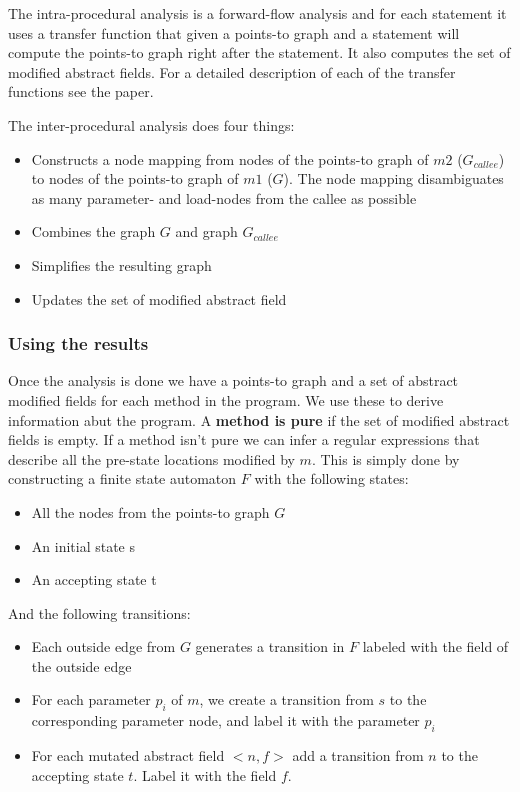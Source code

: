 \documentclass[11pt]{exam}
\begin{document}
The intra-procedural analysis is a forward-flow analysis and for each
statement it uses a transfer function that given a points-to graph and
a statement will compute the points-to graph right after the
statement. It also computes the set of modified abstract fields. For a
detailed description of each of the transfer functions see the paper.
\newline

The inter-procedural analysis does four things: 

\begin{itemize}
  \setlength{\itemsep}{1pt}
  \setlength{\parskip}{0pt}
  \item Constructs a node mapping from nodes of the points-to graph of 
        $m2$ ($G_{callee}$) to nodes of the points-to graph of 
        $m1$ ($G$). The node mapping disambiguates as many parameter- 
        and load-nodes from the callee as possible
  \item Combines the graph $G$ and graph $G_{callee}$
  \item Simplifies the resulting graph
  \item Updates the set of modified abstract field
\end{itemize}

\subsubsection*{Using the results}

Once the analysis is done we have a points-to graph and a set of
abstract modified fields for each method in the program. We use these
to derive information abut the program. A \textbf{method is pure} if
the set of modified abstract fields is empty. If a method isn't pure
we can infer a regular expressions that describe all the pre-state
locations modified by $m$. This  is simply done by constructing a
finite state automaton $F$ with the following states:

\begin{itemize}
  \setlength{\itemsep}{1pt}
  \setlength{\parskip}{0pt}
  \item All the nodes from the points-to graph $G$
  \item An initial state s
  \item An accepting state t
\end{itemize}

And the following transitions: 

\begin{itemize}
  \setlength{\itemsep}{1pt}
  \setlength{\parskip}{0pt}
  \item Each outside edge from $G$ generates a transition in $F$ labeled with 
        the field of the outside edge
  \item For each parameter $p_i$ of $m$, we create a transition from $s$ to 
        the corresponding parameter node, and label it with the parameter $p_i$
  \item For each mutated abstract field $<n,f>$ add a transition from $n$ to the 
        accepting state $t$. Label it with the field $f$.
\end{itemize}
\end{document}
